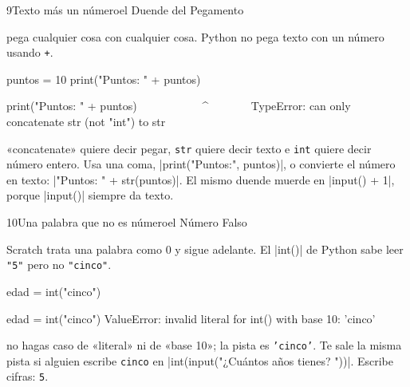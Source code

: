 \begin{bzcard}{9}{Texto más un número}{el Duende del Pegamento}
\noindent\begin{minipage}[c]{0.43\linewidth}
  pega cualquier cosa con cualquier cosa. Python no pega texto con un número usando \texttt{+}.
\end{minipage}\hfill
\begin{minipage}[c]{0.54\linewidth}
\begin{bzsnip}
puntos = 10
print("Puntos: " + puntos)
\end{bzsnip}
\end{minipage}\par
\begin{bzerror}
    print("Puntos: " + puntos)
          ~~~~~~~~~~~^~~~~~~~
TypeError: can only concatenate str (not "int") to str
\end{bzerror}
 «concatenate» quiere decir pegar, \texttt{str} quiere decir texto e \texttt{int} quiere decir número entero. Usa una coma, \py|print("Puntos:", puntos)|, o convierte el número en texto: \py|"Puntos: " + str(puntos)|. El mismo duende muerde en \py|input() + 1|, porque \py|input()| siempre da texto.
\end{bzcard}

\begin{bzcard}{10}{Una palabra que no es número}{el Número Falso}
\noindent\begin{minipage}[c]{0.43\linewidth}
 Scratch trata una palabra como 0 y sigue adelante. El \py|int()| de Python sabe leer \texttt{"5"} pero no \texttt{"cinco"}.
\end{minipage}\hfill
\begin{minipage}[c]{0.54\linewidth}
\begin{bzsnip}
edad = int("cinco")
\end{bzsnip}
\end{minipage}\par
\begin{bzerror}
    edad = int("cinco")
ValueError: invalid literal for int() with base 10: 'cinco'
\end{bzerror}
 no hagas caso de «literal» ni de «base 10»; la pista es \texttt{'cinco'}. Te sale la misma pista si alguien escribe \texttt{cinco} en \py|int(input("¿Cuántos años tienes? "))|. Escribe cifras: \texttt{5}.
\end{bzcard}

